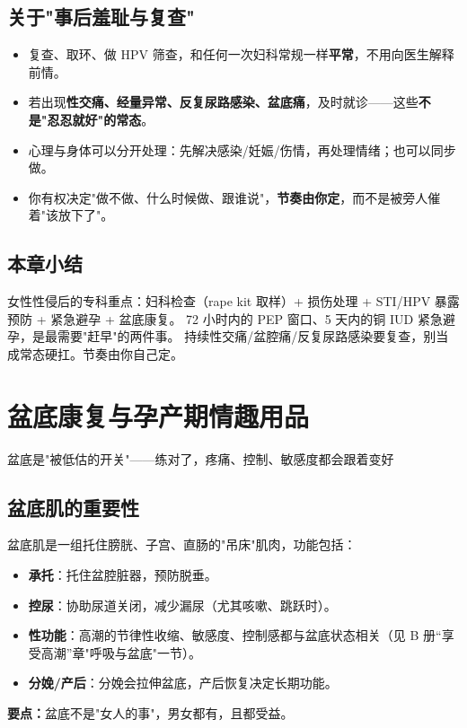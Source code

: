 \section{关于"事后羞耻与复查"}
\begin{itemize}
  \item 复查、取环、做 HPV 筛查，和任何一次妇科常规一样\textbf{平常}，不用向医生解释前情。
  \item 若出现\textbf{性交痛、经量异常、反复尿路感染、盆底痛}，及时就诊——这些\textbf{不是"忍忍就好"的常态}。
  \item 心理与身体可以分开处理：先解决感染/妊娠/伤情，再处理情绪；也可以同步做。
  \item 你有权决定"做不做、什么时候做、跟谁说"，\textbf{节奏由你定}，而不是被旁人催着"该放下了"。
\end{itemize}

\section{本章小结}
女性性侵后的专科重点：妇科检查（rape kit 取样）+ 损伤处理 + STI/HPV 暴露预防 + 紧急避孕 + 盆底康复。
72 小时内的 PEP 窗口、5 天内的铜 IUD 紧急避孕，是最需要"赶早"的两件事。
持续性交痛/盆腔痛/反复尿路感染要复查，别当成常态硬扛。节奏由你自己定。


\chapter{盆底康复与孕产期情趣用品}

\begin{center}
\myhei\large 盆底是"被低估的开关"——练对了，疼痛、控制、敏感度都会跟着变好
\end{center}

\section{盆底肌的重要性}
盆底肌是一组托住膀胱、子宫、直肠的"吊床"肌肉，功能包括：
\begin{itemize}[leftmargin=2em,itemsep=0.3em]
  \item \textbf{承托}：托住盆腔脏器，预防脱垂。
  \item \textbf{控尿}：协助尿道关闭，减少漏尿（尤其咳嗽、跳跃时）。
  \item \textbf{性功能}：高潮的节律性收缩、敏感度、控制感都与盆底状态相关（见 B 册“享受高潮”章"呼吸与盆底"一节）。
  \item \textbf{分娩/产后}：分娩会拉伸盆底，产后恢复决定长期功能。
\end{itemize}
\textbf{要点：}盆底不是"女人的事"，男女都有，且都受益。

